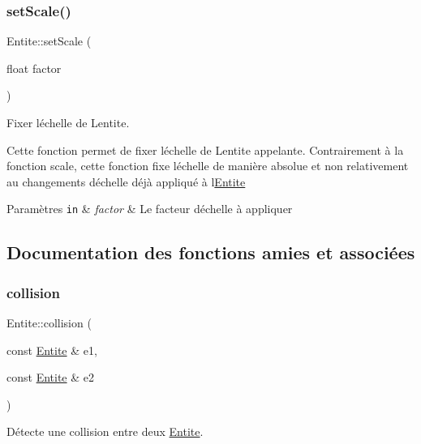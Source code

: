 \subsubsection{\texorpdfstring{set\+Scale()}{setScale()}}
{\footnotesize\ttfamily Entite\+::set\+Scale (\begin{DoxyParamCaption}\item[{float}]{factor }\end{DoxyParamCaption})}



Fixer l\textquotesingle{}échelle de L\textquotesingle{}entite. 

Cette fonction permet de fixer l\textquotesingle{}échelle de L\textquotesingle{}entite appelante. Contrairement à la fonction scale, cette fonction fixe l\textquotesingle{}échelle de manière absolue et non relativement au changements d\textquotesingle{}échelle déjà appliqué à l\textquotesingle{}\hyperlink{class_entite}{Entite} 
\begin{DoxyParams}[1]{Paramètres}
\mbox{\tt in}  & {\em factor} & Le facteur d\textquotesingle{}échelle à appliquer \\
\hline
\end{DoxyParams}


\subsection{Documentation des fonctions amies et associées}
\mbox{\label{class_entite_ac5011435e5099909dd34cd1750933b30}} 
\subsubsection{\texorpdfstring{collision}{collision}}
{\footnotesize\ttfamily Entite\+::collision (\begin{DoxyParamCaption}\item[{const \hyperlink{class_entite}{Entite} \&}]{e1,  }\item[{const \hyperlink{class_entite}{Entite} \&}]{e2 }\end{DoxyParamCaption})\hspace{0.3cm}{\ttfamily [friend]}}



Détecte une collision entre deux \hyperlink{class_entite}{Entite}. 

